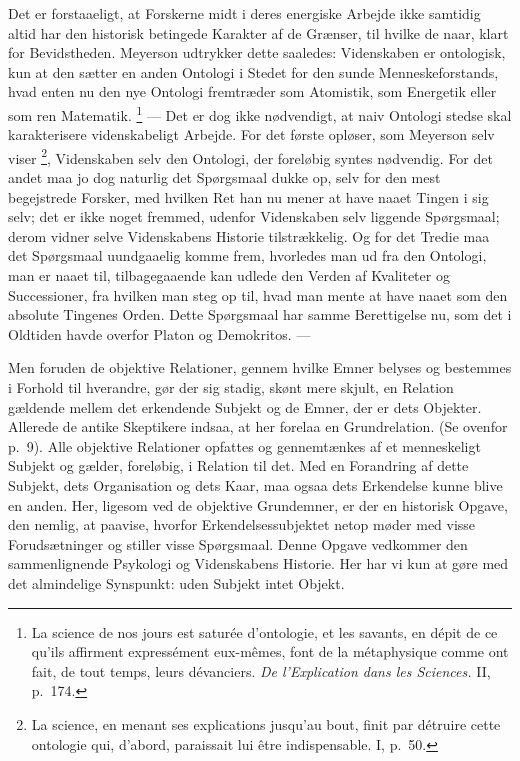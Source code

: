 \documentclass[12pt]{article}
\newcommand{\opage}[1]{\marginnote{\footnotesize\textit{[#1]}}}
\begin{document}
Det er forstaaeligt, at Forskerne midt i deres energiske Arbejde ikke
samtidig altid har den historisk betingede Karakter af de Grænser, til
hvilke de naar, klart for Bevidstheden. Meyerson udtrykker dette
saaledes: Videnskaben er ontologisk, kun at den sætter en anden Ontologi
i Stedet for den sunde Menneskeforstands, hvad enten nu den nye Ontologi
fremtræder som Atomistik, som Energetik eller som ren Matematik.%
\footnote{La science de nos jours est saturée d'ontologie, et les
savants, en dépit de ce qu'ils affirment expressément eux-mêmes, font de
la métaphysique comme ont fait, de tout temps, leurs dévanciers.
\textit{De l'Explication dans les Sciences.} II, p.~174.}
 --- Det er dog ikke nødvendigt, at naiv Ontologi stedse skal
karakterisere videnskabeligt Arbejde. For det første opløser, som
Meyerson selv viser%
\footnote{La science, en menant ses explications jusqu'au bout, finit par
détruire cette ontologie qui, d'abord, paraissait lui être indispensable.
I, p.~50.}, Videnskaben selv den Ontologi, der foreløbig syntes
nødvendig. For det andet maa jo dog naturlig det Spørgsmaal dukke op,
selv for den mest begejstrede Forsker, med hvilken Ret han nu mener at
have naaet \guillemotright Tingen i sig selv\guillemotleft ; det er ikke
noget fremmed, udenfor Videnskaben selv liggende Spørgsmaal; derom vidner
selve Videnskabens Historie tilstrækkelig. Og for det Tredie maa det
Spørgsmaal uundgaaelig komme frem, hvorledes man ud fra den Ontologi, man
er naaet til, tilbagegaaende kan udlede den
\opage{60} Verden af Kvaliteter og Successioner, fra hvilken man steg op til, hvad
man mente at have naaet som den absolute Tingenes Orden. Dette Spørgsmaal
har samme Berettigelse nu, som det i Oldtiden havde overfor Platon og
Demokritos. ---

Men foruden de objektive Relationer, gennem hvilke Emner belyses og
bestemmes i Forhold til hverandre, gør der sig stadig, skønt mere skjult,
en Relation gældende mellem det erkendende Subjekt og de Emner, der er
dets Objekter. Allerede de antike Skeptikere indsaa, at her forelaa en
Grundrelation. (Se ovenfor p.~9). Alle objektive Relationer opfattes og
gennemtænkes af et menneskeligt Subjekt og gælder, foreløbig, i Relation
til det. Med en Forandring af dette Subjekt, dets Organisation og dets
Kaar, maa ogsaa dets Erkendelse kunne blive en anden. Her, ligesom ved de
objektive Grundemner, er der en historisk Opgave, den nemlig, at paavise,
hvorfor Erkendelsessubjektet netop møder med visse Forudsætninger og
stiller visse Spørgsmaal. Denne Opgave vedkommer den sammenlignende
Psykologi og Videnskabens Historie. Her har vi kun at gøre med det
almindelige Synspunkt: uden Subjekt intet Objekt.
\end{document}
